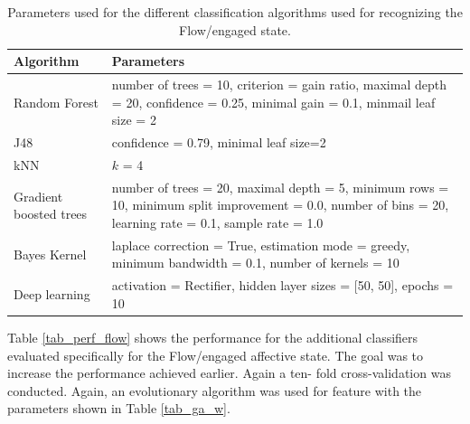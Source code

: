 \documentclass[a4paper,twoside]{article}
\begin{document}
\begin{table}[!t]
\centering
\caption{Parameters used for the different classification algorithms
  used for recognizing the Flow/engaged state.}
\label{tab_params_ml}
    \begin{tabular}{ | l | p{10cm} |  }
\hline
      Algorithm & Parameters \\
      \hline 
      Random Forest &  number of trees = 10, 
criterion = gain ratio, maximal depth = 20, 
                      confidence = 0.25, minimal gain = 0.1, minmail leaf size = 2 \\
      J48 &  confidence = 0.79, minimal leaf size=2 \\
      kNN & $k$ = 4 \\
      Gradient boosted trees & number of trees = 20,  maximal depth = 5, minimum rows = 10, 
minimum split 
improvement = 0.0, number of bins = 20, 
                               learning rate = 0.1, sample rate = 1.0 \\
      Bayes Kernel & laplace correction = True, estimation mode = greedy, 
                     minimum bandwidth = 0.1, number of kernels = 10 \\
      Deep learning & activation = Rectifier, hidden layer sizes =
                      [50, 50], epochs = 10 \\
      \hline
    \end{tabular}
  \end{table}
      
Table \ref{tab_perf_flow} shows the performance for the additional classifiers
evaluated specifically for the Flow/engaged affective state. The goal was to
increase the performance achieved earlier. Again a ten-
fold cross-validation was conducted. Again, an evolutionary algorithm was used for feature with the parameters shown in Table \ref{tab_ga_w}.
\end{document}
